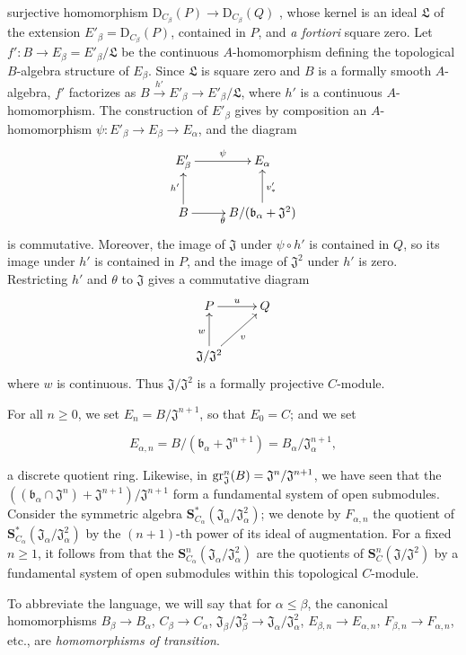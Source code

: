 \begin{env}[19.5.6.1]
surjective homomorphism
$\mathrm{D}_{C_\beta}(P)\to\mathrm{D}_{C_\beta}(Q)$ , whose
kernel is an ideal $\mathfrak{L}$ of the extension
$E'_\beta=\mathrm{D}_{C_\beta}(P)$, contained in $P$, and \emph{a fortiori}
square zero.
Let $f':B\to E_\beta=E'_\beta/\mathfrak{L}$ be the continuous $A$-homomorphism
defining the topological $B$-algebra structure of $E_\beta$.
Since $\mathfrak{L}$ is square zero and $B$ is a formally smooth $A$-algebra,
$f'$ factorizes as
$B\xrightarrow{h'}E'_\beta\to E'_\beta/\mathfrak{L}$, where $h'$ is a
continuous $A$-homomorphism.
The construction of $E'_\beta$ gives by composition an $A$-homomorphism
$\psi:E'_\beta\to E_\beta\to E_\alpha$, and the diagram
\[
  \xymatrix{
    E'_\beta \ar[r]^\psi & E_\alpha \\
    B \ar[u]^{h'} \ar[r]_\theta &
    B/(\mathfrak{b}_\alpha+\mathfrak{J}^2) \ar[u]_{v'_*}
  }
\]
is commutative.
Moreover, the image of $\mathfrak{J}$ under $\psi\circ h'$ is contained in $Q$,
so its image under $h'$ is contained in $P$, and the image of
$\mathfrak{J}^2$ under $h'$ is zero.
Restricting $h'$ and $\theta$ to $\mathfrak{J}$ gives a commutative diagram
\[
  \xymatrix{
    P \ar[r]^u & Q \\
    \mathfrak{J}/\mathfrak{J}^2 \ar[u]^w \ar[ur]_v
  }
\]
where $w$ is continuous.
Thus $\mathfrak{J}/\mathfrak{J}^2$ is a formally projective $C$-module.
\end{env}

\begin{env}[19.5.6.2]
\label{0.19.5.6.2}
For all $n\geq 0$, we set $E_n=B/\mathfrak{J}^{n+1}$, so that $E_0=C$;
and we set

\[
E_{\alpha,n}=B/(\mathfrak{b}_\alpha+\mathfrak{J}^{n+1})=B_\alpha/\mathfrak{J}_\alpha^{n+1},
\]

a discrete quotient ring.
Likewise, in $\operatorname{gr}_\mathfrak{J}^n(B)=\mathfrak{J}^n/\mathfrak{J}^{n+1}$, we have seen that the $((\mathfrak{b}_\alpha\cap\mathfrak{J}^n)+\mathfrak{J}^{n+1})/\mathfrak{J}^{n+1}$ form a fundamental system of open submodules.
Consider the symmetric algebra $\mathbf{S}_{C_\alpha}^*(\mathfrak{J}_\alpha/\mathfrak{J}_\alpha^2)$;
we denote by $F_{\alpha,n}$ the quotient of $\mathbf{S}_{C_\alpha}^*(\mathfrak{J}_\alpha/\mathfrak{J}_\alpha^2)$ by the $(n+1)$-th power of its ideal of augmentation.
For a fixed $n\geq 1$, it follows from  that the $\mathbf{S}_{C_\alpha}^n(\mathfrak{J}_\alpha/\mathfrak{J}_\alpha^2)$ are the quotients of $\mathbf{S}_C^n(\mathfrak{J}/\mathfrak{J}^2)$ by a fundamental system of open submodules within this topological $C$-module.

To abbreviate the language, we will say that for $\alpha\leq\beta$, the canonical homomorphisms $B_\beta\to B_\alpha$, $C_\beta\to C_\alpha$, $\mathfrak{J}_\beta/\mathfrak{J}_\beta^2\to\mathfrak{J}_\alpha/\mathfrak{J}_\alpha^2$, $E_{\beta,n}\to E_{\alpha,n}$, $F_{\beta,n}\to F_{\alpha,n}$, etc., are \emph{homomorphisms of transition}.
\end{env}

